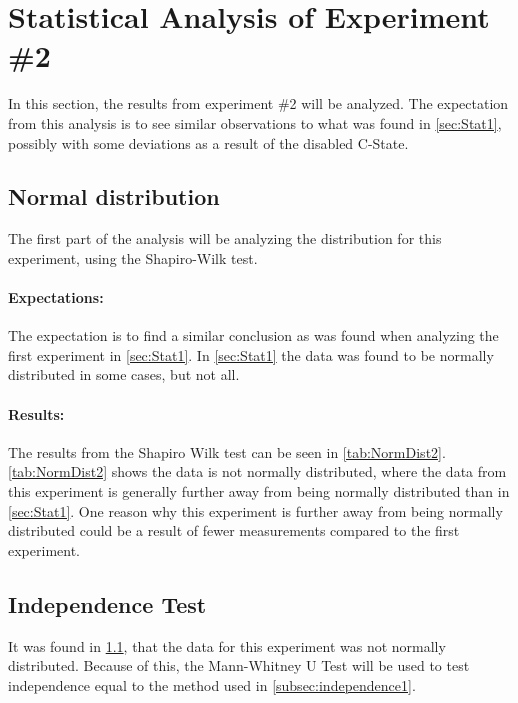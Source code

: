 \section{Statistical Analysis of Experiment \#2}\label{sec:Stat2}
In this section, the results from experiment \#2 will be analyzed. The expectation from this analysis is to see similar observations to what was found in \cref{sec:Stat1}, possibly with some deviations as a result of the disabled C-State. 

\subsection{Normal distribution}\label{subsec:NormalDist2}

The first part of the analysis will be analyzing the distribution for this experiment, using the Shapiro-Wilk test\cite{razali2011power}.

\paragraph{Expectations:} The expectation is to find a similar conclusion as was found when analyzing the first experiment in \cref{sec:Stat1}. In \cref{sec:Stat1} the data was found to be normally distributed in some cases, but not all.

 


\paragraph{Results:} The results from the Shapiro Wilk test can be seen in \cref{tab:NormDist2}. \cref{tab:NormDist2} shows the data is not normally distributed, where the data from this experiment is generally further away from being normally distributed than in \cref{sec:Stat1}. One reason why this experiment is further away from being normally distributed could be a result of fewer measurements compared to the first experiment.

\subsection{Independence Test}\label{subsec:independence2}
It was found in \cref{subsec:NormalDist2}, that the data for this experiment was not normally distributed. Because of this, the Mann-Whitney U Test\cite{mann1947test} will be used to test independence equal to the method used in \cref{subsec:independence1}.

